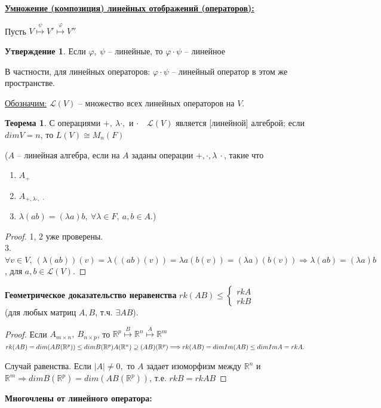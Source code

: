 \documentclass[a4paper, 12pt]{article}
\theoremstyle{definition}
\newtheorem*{theorem}{Теорема}
\newtheorem*{subtheorem}{Утверждение}
\begin{document}
    \underline{\textbf{Умножение (композиция) линейных отображений (операторов):}}

    Пусть $V \overset{\psi}{\longmapsto} V' \overset{\varphi}{\longmapsto}  V''$ 

    \begin{subtheorem}
        Если $\varphi,\ \psi$ -- линейные, то $\varphi\cdot \psi$ --
        линейное  
    \end{subtheorem}

    В частности, для линейных операторов: $\varphi\cdot \psi$ --
    линейный оператор в этом же пространстве.
    
    \underline{Обозначим:} $\mathcal{L}(V)$ -- множество всех линейных операторов на $V$.
    
    \begin{theorem}
        С операциями $+,\ \lambda \cdot,$ и $\cdot$\ \ $\mathcal{L}(V)$ является
        [линейной] алгеброй; если $dimV = n$, то $L(V) \cong M_n(F)$  
    \end{theorem}
    
    ($A$ -- линейная алгебра, если на $A$ заданы операции
    $+, \cdot, \lambda\ \cdot$, такие что
    \begin{enumerate}
        \item $A_+ $
        \item $A_{+,\lambda\cdot,\ \cdot}$
        \item $\lambda (ab) = (\lambda a)b,\ \forall \lambda
        \in F,\ a,b \in A.$)
    \end{enumerate}
    
    \begin{proof}
        1, 2 уже проверены.\\
        3. $\forall v \in V,\ (\lambda(ab))(v) = \lambda
        ((ab)(v)) = \lambda a(b(v)) = (\lambda a)(b(v))
        \Longrightarrow \lambda(ab) = (\lambda a)b$, для 
        $a,b \in \mathcal{L}(V)$.  
    \end{proof}

    \textbf{Геометрическое доказательство неравенства} $rk(AB) \leq
    \begin{cases}
        rkA\\rkB
    \end{cases}$\\ (для любых матриц $A,B$, т.ч. $\exists AB$).
    \begin{proof}
        Если $A_{m\times n},\ B_{n\times p}$, то $\mathbb{R}^p
        \overset{B}{\longmapsto} \mathbb{R}^n \overset{A}{\longmapsto}
        \mathbb{R}^m$\\
        $rk(AB) = dim(AB(\mathbb{R}^p)) \leq dimB(\mathbb{R}^p)\\
        A(\mathbb{R}^n) \supseteq (AB)(\mathbb{R}^p)
        \Longrightarrow rk(AB) = dimIm(AB) \leq dimImA = rkA.$

        Случай равенства. Если $|A| \neq 0,$ то $A$ задает
        изоморфизм между $\mathbb{R}^n$ и $\mathbb{R}^m
        \Longrightarrow dimB(\mathbb{R}^p) = dim(AB(\mathbb{R}^p))$,
    т.е. $rkB = rkAB$

    \end{proof}
    \textbf{Многочлены от линейного оператора:}
\end{document}
